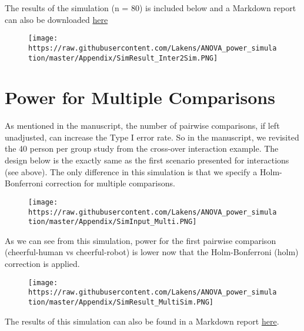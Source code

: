 \documentclass[]{article}
\begin{document}
The results of the simulation (n = 80) is included below and a Markdown
report can also be downloaded
\href{https://github.com/Lakens/ANOVA_power_simulation/blob/master/Appendix/Report_Inter2.pdf}{here}

\begin{figure}
\centering
\texttt{[image: https://raw.githubusercontent.com/Lakens/ANOVA\_power\_simulation/master/Appendix/SimResult\_Inter2Sim.PNG]}
\caption{}
\end{figure}

\section{Power for Multiple
Comparisons}\label{power-for-multiple-comparisons}

As mentioned in the manuscript, the number of pairwise comparisons, if
left unadjusted, can increase the Type I error rate. So in the
manuscript, we revisited the 40 person per group study from the
cross-over interaction example. The design below is the exactly same as
the first scenario presented for interactions (see above). The only
difference in this simulation is that we specify a Holm-Bonferroni
correction for multiple comparisons.

\begin{figure}
\centering
\texttt{[image: https://raw.githubusercontent.com/Lakens/ANOVA\_power\_simulation/master/Appendix/SimInput\_Multi.PNG]}
\caption{}
\end{figure}

As we can see from this simulation, power for the first pairwise
comparison (cheerful-human vs cheerful-robot) is lower now that the
Holm-Bonferroni (holm) correction is applied.

\begin{figure}
\centering
\texttt{[image: https://raw.githubusercontent.com/Lakens/ANOVA\_power\_simulation/master/Appendix/SimResult\_MultiSim.PNG]}
\caption{}
\end{figure}

The results of this simulation can also be found in a Markdown report
\href{https://github.com/Lakens/ANOVA_power_simulation/blob/master/Appendix/Report_Multi.pdf}{here}.
\end{document}
